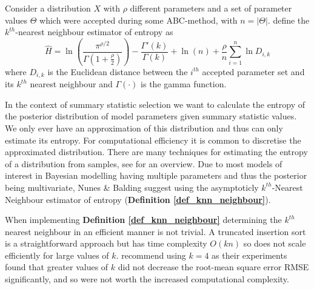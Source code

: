 \documentclass[bibliography=totoc,11pt,a4paper,margin=0]{article}
\theoremstyle{break}
\begin{document}

  \begin{box_definition}\label{def_knn_neighbour}
    Consider a distribution $X$ with $\rho$ different parameters and a set of parameter values $\Theta$ which were accepted during some ABC-method, with $n=|\Theta|$. \cite{nearest_neighbour_estimates_of_entropy} define the $k^{th}$-nearest neighbour estimator of entropy as
    \[ \hat{H}=\ln\left(\frac{\pi^{\rho/2}}{\Gamma\left(1+\frac\rho2\right)}\right)-\frac{\Gamma'(k)}{\Gamma(k)}+\ln(n)+\frac\rho{n}\sum_{i=1}^n\ln D_{i,k} \]
    where $D_{i,k}$ is the Euclidean distance between the $i^{th}$ accepted parameter set and its $k^{th}$ nearest neighbour and $\Gamma(\cdot)$ is the gamma function.
  \end{box_definition}

  \par In the context of summary statistic selection we want to calculate the entropy of the posterior distribution of model parameters given summary statistic values. We only ever have an approximation of this distribution and thus can only estimate its entropy. For computational efficiency it is common to discretise the approximated distribution. There are many techniques for estimating the entropy of a distribution from samples, see \cite[]{non_parameteric_entropy_estimation} for an overview. Due to most models of interest in Bayesian modelling having multiple parameters and thus the posterior being multivariate, Nunes \& Balding suggest using the asymptoticly $k^{th}$-Nearest Neighbour estimator of entropy \cite{nearest_neighbour_estimates_of_entropy} (\textbf{Definition \ref{def_knn_neighbour}}).

  \par When implementing \textbf{Definition \ref{def_knn_neighbour}} determining the $k^{th}$ nearest neighbour in an efficient manner is not trivial. A truncated insertion sort is a straightforward approach but has time complexity $O(kn)$ so does not scale efficiently for large values of $k$. \cite[]{nearest_neighbour_estimates_of_entropy} recommend using $k=4$ as their experiments found that greater values of $k$ did not decrease the root-mean square error RMSE significantly, and so were not worth the increased computational complexity.
\end{document}

